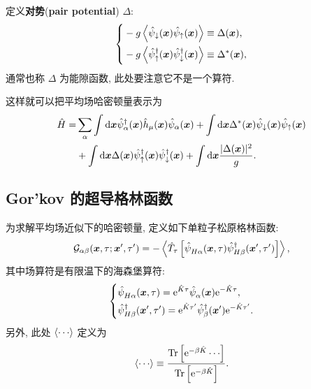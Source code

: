 定义\textbf{对势}(\textbf{pair potential}) $\Delta$:
\begin{equation}
    \left\{
        \begin{aligned}
            &-g\left\langle\hat{\psi}_{\downarrow}(\boldsymbol{x}) \hat{\psi}_{\uparrow}(\boldsymbol{x})\right\rangle \equiv \Delta(\boldsymbol{x}), \\
            &-g\left\langle\hat{\psi}_{\uparrow}^\dagger(\boldsymbol{x}) \hat{\psi}_{\downarrow}^\dagger(\boldsymbol{x})\right\rangle \equiv \Delta^*(\boldsymbol{x}) ,
        \end{aligned}
    \right.
\end{equation}
通常也称 $\Delta$ 为能隙函数, 此处要注意它不是一个算符. 

这样就可以把平均场哈密顿量表示为
  \begin{align}
        \hat{H}=&\sum_\alpha \int \mathrm{d} \boldsymbol{x} \hat{\psi}_\alpha^\dagger(\boldsymbol{x}) \hat{h}_\mu(\boldsymbol{x}) \hat{\psi}_\alpha(\boldsymbol{x})+\int \mathrm{d} \boldsymbol{x} \Delta^*(\boldsymbol{x}) \hat{\psi}_{\downarrow}(\boldsymbol{x}) \hat{\psi}_{\uparrow}(\boldsymbol{x})\nonumber\\
        &+\int \mathrm{d} \boldsymbol{x} \Delta(\boldsymbol{x}) \hat{\psi}_{\uparrow}^\dagger(\boldsymbol{x}) \hat{\psi}_{\downarrow}^\dagger(\boldsymbol{x})+\int \mathrm{d} \boldsymbol{x} \frac{|\Delta(\boldsymbol{x})|^2}{g}.
    \end{align}
\subsection{Gor'kov 的超导格林函数}
为求解平均场近似下的哈密顿量, 定义如下单粒子松原格林函数: 
\begin{equation}
    \mathcal{G}_{\alpha\beta}(\boldsymbol{x},\tau;\boldsymbol{x}',\tau')=-\left\langle \hat{T}_\tau\left[ \hat{\psi}_{H\alpha}^{ }(\boldsymbol{x},\tau)\hat{\psi}_{H\beta}^\dagger(\boldsymbol{x}',\tau') \right] \right\rangle,
\end{equation}
其中场算符是有限温下的海森堡算符: 
\begin{equation}
    \left\{
        \begin{aligned}
            &\hat{\psi}_{H\alpha}^{ }(\boldsymbol{x},\tau)=\mathrm{e}^{\hat{K}\tau}\hat\psi_{\alpha}^{ }(\boldsymbol{x})\mathrm{e}^{-\hat{K}\tau},\\
            &\hat{\psi}_{H\beta}^{\dagger}(\boldsymbol{x}',\tau')=\mathrm{e}^{\hat{K}\tau'}\hat{\psi}_{\beta}^{\dagger}(\boldsymbol{x}')\mathrm{e}^{-\hat{K}\tau'}.
        \end{aligned}
    \right.
\end{equation}
另外, 此处 $\lag\cdots\rag$ 定义为 
\begin{equation}
    \lag\cdots\rag\equiv \frac{\fun{Tr}\lmi \e^{-\beta\hat{K}}\cdots \rmi}{\fun{Tr}\lmi \e^{-\beta\hat{K}} \rmi}.
\end{equation}

